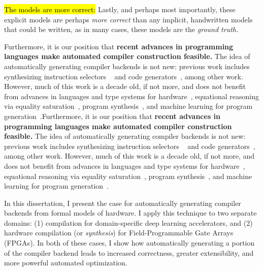 \hl{The models are more correct:}
Lastly, and perhaps most importantly,
  these explicit models
  are perhaps \textit{more correct}
  than any implicit, handwritten models
  that could be written,
  as in many cases, these models
  are the \textit{ground truth.}

Furthermore, it is our position that
  \textbf{recent advances
  in programming languages
  make automated compiler construction
  feasible.}
The idea of automatically generating
  compiler backends is not new:
  previous work includes
  synthesizing instruction selectors%
  ~\cite{buchwald2018synthesizing,dias2010automatically,brandner2007compiler,daly2022synthesizing}
  and code generators~\cite{leupers1997retargetable,brandner2013automatic},
  among other work.
However, much of this work
  is a decade old, if not more,
  and does not benefit from
  advances in
  languages and type systems
  for hardware~\cite{durst2020type,nigam2023modular,nigam2020predictable},
  equational reasoning via equality saturation~\cite{tate2009equality,willsey2021egg},
  program synthesis~\cite{solar2008program,torlak2013growing},
  and machine learning for program generation~\cite{alon2019code2vec,austin2021program}.Furthermore, it is our position that
  \textbf{recent advances
  in programming languages
  make automated compiler construction
  feasible.}
The idea of automatically generating
  compiler backends is not new:
  previous work includes
  synthesizing instruction selectors%
  ~\cite{buchwald2018synthesizing,dias2010automatically,brandner2007compiler,daly2022synthesizing}
  and code generators~\cite{leupers1997retargetable,brandner2013automatic},
  among other work.
However, much of this work
  is a decade old, if not more,
  and does not benefit from
  advances in
  languages and type systems
  for hardware~\cite{durst2020type,nigam2023modular,nigam2020predictable},
  equational reasoning via equality saturation~\cite{tate2009equality,willsey2021egg},
  program synthesis~\cite{solar2008program,torlak2013growing},
  and machine learning for program generation~\cite{alon2019code2vec,austin2021program}.

In this dissertation,
  I present the case for
  automatically generating compiler backends
  from
  formal models of hardware.
I apply this technique
  to two separate domains:
  (1) compilation for
  domain-specific 
  deep learning accelerators,
  and
  (2) hardware compilation 
  (or \textit{synthesis})
  for Field-Programmable
  Gate Arrays (FPGAs).
In both of these cases,
  I show how
  automatically generating
  a portion of the compiler backend
  leads to increased correctness,
  greater extensibility,
  and more powerful automated optimization.

